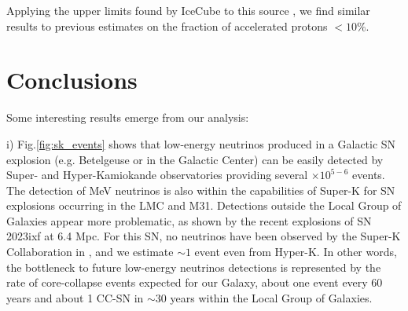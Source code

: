 \documentclass[twocolumn]{aastex631}
\begin{document}


Applying the upper limits found by IceCube to this source \citep{IceCubeSN2023},
we find similar results to previous estimates on the fraction of accelerated protons $<10\%$.


\bigskip

\section{Conclusions} 
\bigskip

Some interesting results emerge from our analysis:
\bigskip

i) Fig.\ref{fig:sk_events} shows that low-energy neutrinos produced in a Galactic SN explosion (e.g. Betelgeuse or in the Galactic Center) can be easily detected by Super- and Hyper-Kamiokande observatories providing several $\times 10^{5-6}$ events. The detection of MeV neutrinos is also within the capabilities of Super-K for SN explosions occurring in the LMC and M31. Detections outside the Local Group of Galaxies appear more problematic, as shown by the recent explosions of SN 2023ixf at 6.4 Mpc. For this SN, no neutrinos have been observed by the Super-K Collaboration in \cite{atel_sk}, and we estimate $\sim 1$ event even from Hyper-K. In other words, the bottleneck to future low-energy neutrinos detections is represented by the rate of core-collapse events expected for our Galaxy, about one event every 60 years \citep{Cappellaro2015,Rozwadowska2021} and about 1 CC-SN in $\sim 30$ years within the Local Group of Galaxies. 
\end{document}

